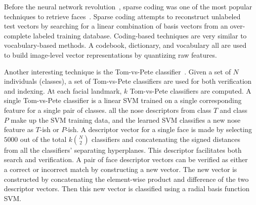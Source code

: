         Before the neural network revolution~\cite{krizhevsky_imagenet_2012}, sparse coding was one of the most
        popular techniques to retrieve faces~\cite{aharon_k_svd_2006, wright_robust_2009, zhang_sparse_2011,
        jiang_label_2013}. Sparse coding attempts to reconstruct unlabeled test vectors by searching for a linear
        combination of basis vectors from an over-complete labeled training database. Coding-based techniques are
        very similar to vocabulary-based methods. A codebook, dictionary, and vocabulary all are used to build
        image-level vector representations by quantizing raw features.

        Another interesting technique is the Tom-vs-Pete classifier~\cite{berg_tom_vs_pete_2012}. Given a set of
        $N$ individuals (classes), a set of Tom-vs-Pete classifiers are used for both verification and indexing. At
        each facial landmark, $k$ Tom-vs-Pete classifiers are computed. A single Tom-vs-Pete classifier is a linear
        SVM trained on a single corresponding feature for a single pair of classes. \Eg{} all the nose descriptors
        from class $T$ and class $P$ make up the SVM training data, and the learned SVM classifies a new nose
        feature as $T$-ish or $P$-ish. A descriptor vector for a single face is made by selecting $5000$ out of the
        total $k\binom{N}{2}$ classifiers and concatenating the signed distances from all the classifiers'
        separating hyperplanes. This descriptor facilitates both search and verification. A pair of face descriptor
        vectors can be verified as either a correct or incorrect match by constructing a new vector. The new vector
        is constructed by concatenating the element-wise product and difference of the two descriptor vectors. Then
        this new vector is classified using a radial basis function SVM{}.

